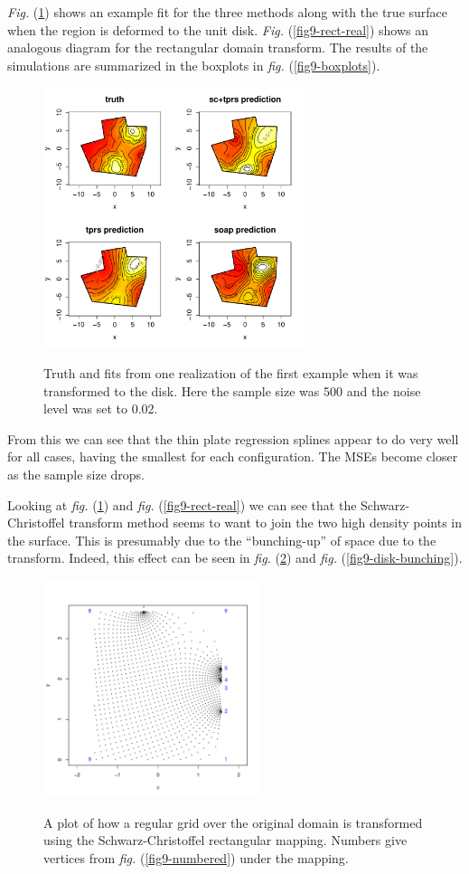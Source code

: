 \documentclass[a4paper,10pt]{amsart}
\newcommand{\sch}{Schwarz-Christoffel }
\newcommand{\fig}[1]{\emph{fig.} (\ref{#1})}
\newcommand{\Fig}[1]{\emph{Fig.} (\ref{#1})}
\begin{document}
\Fig{fig9-disk-real} shows an example fit for the three methods along with the true surface when the region is deformed to the unit disk. \Fig{fig9-rect-real} shows an analogous diagram for the rectangular domain transform. The results of the simulations are summarized in the boxplots in \fig{fig9-boxplots}.

\begin{figure}[tbp]
\centering
\includegraphics[width=3in]{figs-otherdomains/fig9-disk-real.pdf} \\
\caption{Truth and fits from one realization of the first example when it was transformed to the disk. Here the sample size was 500 and the noise level was set to 0.02.}
\label{fig9-disk-real}
\end{figure}

From this we can see that the thin plate regression splines appear to do very well for all cases, having the smallest for each configuration. The MSEs become closer as the sample size drops.

Looking at \fig{fig9-disk-real} and \fig{fig9-rect-real} we can see that the \sch transform method seems to want to join the two high density points in the surface. This is presumably due to the ``bunching-up'' of space due to the transform. Indeed, this effect can be seen in \fig{fig9-rect-bunching} and \fig{fig9-disk-bunching}.


\begin{figure}[tbp]
\centering
\includegraphics[width=2.5in]{figs-otherdomains/fig9-pointplot-rect.pdf} \\
\caption{A plot of how a regular grid over the original domain is transformed using the \sch rectangular mapping. Numbers give vertices from \fig{fig9-numbered} under the mapping.}
\label{fig9-rect-bunching}
\end{figure}
\end{document}
